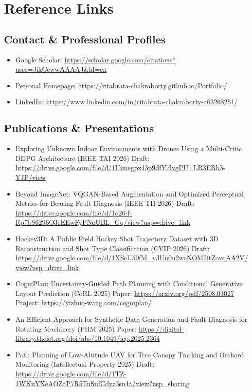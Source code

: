 \documentclass[letterpaper,10pt]{article}
\newcommand{\nbresumeItemListStart}{
  \begin{itemize}[leftmargin=0.10in, label={}, itemsep=2pt, parsep=2pt]\vspace{6pt}
}
\newcommand{\nbresumeItem}[1]{
  \item \small{#1}
}
\newcommand{\nbresumeItemListEnd}{
  \end{itemize}\vspace{-6pt}
}
\begin{document}

\newpage

\section*{Reference Links}

\vspace{6pt}

\subsection*{Contact \& Professional Profiles}
\nbresumeItemListStart
  \nbresumeItem{Google Scholar: \color{blue}\url{https://scholar.google.com/citations?user=JikCewwAAAAJ&hl=en}}
  \nbresumeItem{Personal Homepage: \color{blue}\url{https://ritabrata-chakraborty.github.io/Portfolio/}}
  \nbresumeItem{LinkedIn: \color{blue}\url{https://www.linkedin.com/in/ritabrata-chakraborty-a63268251/}}
\nbresumeItemListEnd

\subsection*{Publications \& Presentations}
\nbresumeItemListStart
  \nbresumeItem{Exploring Unknown Indoor Environments with Drones Using a Multi-Critic DDPG Architecture (IEEE TAI 2026) \break
  {Draft: \color{blue}\url{https://drive.google.com/file/d/1Uimegpx43p9dfY7lvgPU_LR3ERb3-YJP/view}}}
  \nbresumeItem{Beyond ImageNet: VQGAN-Based Augmentation and Optimized Perceptual Metrics for Bearing Fault Diagnosis (IEEE TII 2026) \break
  {Draft: \color{blue}\url{https://drive.google.com/file/d/1o26-f-Rp7bS6296O3eEEwFyPNoUBL_Gq/view?usp=drive_link}}}
  \nbresumeItem{Hockey3D: A Public Field Hockey Shot Trajectory Dataset with 3D Reconstruction and Shot Type Classification (CVIP 2026) \break
  {Draft: \color{blue}\url{https://drive.google.com/file/d/1XSeU50fM_yJUn0u2wcNOM2itZovqAA2V/view?usp=drive_link}}}
  \nbresumeItem{CogniPlan: Uncertainty-Guided Path Planning with Conditional Generative Layout Prediction (CoRL 2025) \break
  {Paper: \color{blue}\url{https://arxiv.org/pdf/2508.03027}} \break
  {Project: \color{blue}\url{https://yizhuo-wang.com/cogniplan/}}}
  \nbresumeItem{An Efficient Approach for Synthetic Data Generation and Fault Diagnosis for Rotating Machinery (PHM 2025) \break
  {Paper: \color{blue}\url{https://digital-library.theiet.org/doi/abs/10.1049/icp.2025.2364}}}
  \nbresumeItem{Path Planning of Low-Altitude UAV for Tree Canopy Tracking and Orchard Monitoring (Intellectual Property 2025) \break
  {Draft: \color{blue}\url{https://drive.google.com/file/d/1TZ-1WKuYXeAOZaP7R5TnSufCdyz3sn4a/view?usp=sharing}}}
\nbresumeItemListEnd
\end{document}
